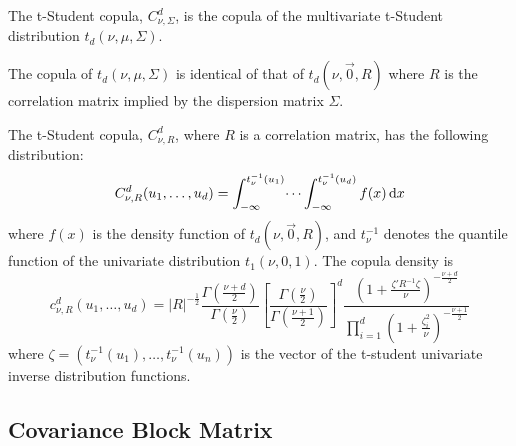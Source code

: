 \documentclass[11pt,fleqn]{book} %
\begin{document}
\begin{definition}
The t-Student copula, $C_{\nu,\Sigma}^d$, is the copula of the multivariate 
t-Student distribution $t_d(\nu,\mu,\Sigma)$.
\end{definition}

\begin{proposition}
The copula of $t_d(\nu,\mu,\Sigma)$ is identical of that of $t_d(\nu,\vec{0},R)$
where $R$ is the correlation matrix implied by the dispersion matrix $\Sigma$.
\end{proposition}

\begin{proposition}
The t-Student copula, $C_{\nu,R}^d$, where $R$ is a correlation matrix,
has the following distribution:
\begin{displaymath}
C_{\nu,R}^d(u_1, \dots, u_d) = 
\int_{-\infty}^{t_\nu^{-1}(u_1)} \dots \int_{-\infty}^{t_\nu^{-1}(u_d)} f(x) \mathop{\mathrm{{}d}}\mathopen{} x
\end{displaymath}
where $f(x)$ is the density function of $t_d(\nu,\vec{0},R)$, and $t_{\nu}^{-1}$ denotes the 
quantile function of the univariate distribution $t_1(\nu,0,1)$. 
The copula density is
\begin{displaymath}
\label{eq:density}
c_{\nu,R}^d(u_1,\dots,u_d) = %
|R|^{-\frac{1}{2}} 
\displaystyle\frac{\Gamma{\left(\frac{\nu+d}{2}\right)}}{\Gamma{\left(\frac{\nu}{2}\right)}}
\displaystyle\left[ \frac{\Gamma{\left(\frac{\nu}{2}\right)}}{\Gamma{\left(\frac{\nu+1}{2}\right)}} \right]^d
\frac{\displaystyle\left( 1+\frac{\zeta' R^{-1} \zeta}{\nu}\right)^{-\frac{\nu+d}{2}}}{\displaystyle\prod_{i=1}^d \left( 1+\frac{\zeta_i^2}{\nu} \right)^{-\frac{\nu+1}{2}}}
\end{displaymath}
\noindent
where $\zeta=(t_\nu^{-1}(u_1), \dots, t_\nu^{-1}(u_n))$ is the vector of the t-student 
univariate inverse distribution functions.
\end{proposition}


\subsection{Covariance Block Matrix}
\end{document}
